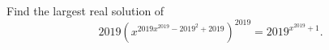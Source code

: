 Find the largest real solution of
\[2019\left(x^{2019x^{2019}-2019^2+2019}\right)^{2019}=2019^{x^{2019}+1}.\]
